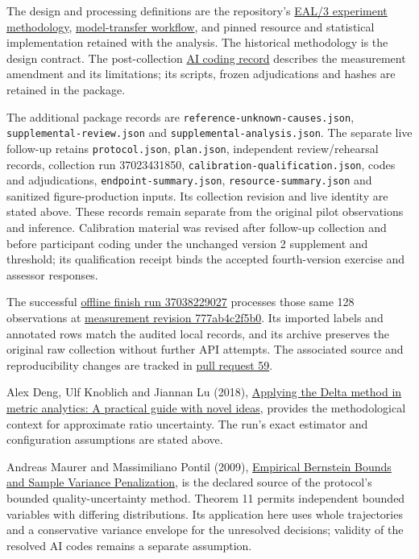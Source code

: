 \documentclass[
  11pt,
]{article}
\begin{document}
The design and processing definitions are the repository's
\href{https://github.com/emmett08/earl/blob/c0974bc6bb6a2df30d1423b6248bfc51b4d2a9d7/docs/eal3-experiment-methodology.md}{EAL/3
experiment methodology},
\href{https://github.com/emmett08/earl/blob/c0974bc6bb6a2df30d1423b6248bfc51b4d2a9d7/experiments/model_transfer/WORKFLOW.md}{model-transfer
workflow}, and pinned resource and statistical implementation retained
with the analysis. The historical methodology is the design contract.
The post-collection
\href{https://github.com/emmett08/earl/blob/cea2b59e686d57e0c071924f184b497919ec91a7/annotations/pilot-36985062352-AI-CODING.md}{AI
coding record} describes the measurement amendment and its limitations;
its scripts, frozen adjudications and hashes are retained in the
package.

The additional package records are
\texttt{reference-\allowbreak{}unknown-\allowbreak{}causes.json},
\texttt{supplemental-\allowbreak{}review.json} and
\texttt{supplemental-\allowbreak{}analysis.json}. The separate live follow-up retains
\texttt{protocol.json}, \texttt{plan.json}, independent review/rehearsal
records, collection run 37023431850,
\texttt{calibration-\allowbreak{}qualification.json}, codes and adjudications,
\texttt{endpoint-\allowbreak{}summary.json}, \texttt{resource-\allowbreak{}summary.json} and
sanitized figure-production inputs. Its collection revision and live
identity are stated above. These records remain separate from the
original pilot observations and inference. Calibration material was
revised after follow-up collection and before participant coding under
the unchanged version 2 supplement and threshold; its qualification
receipt binds the accepted fourth-version exercise and assessor
responses.

The successful
\href{https://github.com/emmett08/earl/actions/runs/37038229027}{offline
finish run 37038229027} processes those same 128 observations at
\href{https://github.com/emmett08/earl/commit/777ab4c2f5b0ed2165d662992db0413d82dde14a}{measurement
revision 777ab4c2f5b0}. Its imported labels and annotated rows match the
audited local records, and its archive preserves the original raw
collection without further API attempts. The associated source and
reproducibility changes are tracked in
\href{https://github.com/emmett08/earl/pull/59}{pull request 59}.

Alex Deng, Ulf Knoblich and Jiannan Lu (2018),
\href{https://arxiv.org/abs/1803.06336}{Applying the Delta method in
metric analytics: A practical guide with novel ideas}, provides the
methodological context for approximate ratio uncertainty. The run's
exact estimator and configuration assumptions are stated above.

Andreas Maurer and Massimiliano Pontil (2009),
\href{https://arxiv.org/abs/0907.3740}{Empirical Bernstein Bounds and
Sample Variance Penalization}, is the declared source of the protocol's
bounded quality-uncertainty method. Theorem 11 permits independent
bounded variables with differing distributions. Its application here
uses whole trajectories and a conservative variance envelope for the
unresolved decisions; validity of the resolved AI codes remains a
separate assumption.
\end{document}
